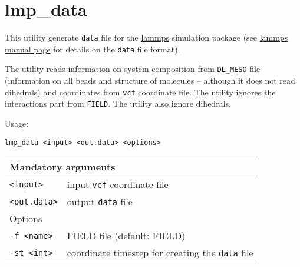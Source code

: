 \section{lmp\_data} \label{sec:lmp_data}

This utility generate \texttt{data} file for the
\href{https://lammps.sandia.gov/}{lammps} simulation package (see
\href{https://lammps.sandia.gov/doc/read_data.html}{lammps manual page} for
details on the \texttt{data} file format).

The utility reads information on system composition from \texttt{DL\_MESO}
file (information on all beads and structure of molecules -- although it
does not read dihedrals) and coordinates from \texttt{vcf} coordinate file.
The utility ignores the interactions part from \texttt{FIELD}. The utility
also ignore dihedrals.

Usage:

\vspace{1em}
\noindent
\texttt{lmp\_data <input> <out.data> <options>}

\noindent
\begin{longtable}{p{}p{}}
  \toprule
  \multicolumn{2}{l}{Mandatory arguments} \\
  \midrule
  \texttt{<input>} & input \texttt{vcf} coordinate file \\
  \texttt{<out.data>} & output \texttt{data} file \\
  \toprule
  \multicolumn{2}{l}{Options} \\
  \midrule
  \texttt{-f <name>} & FIELD file (default: FIELD)\\
  \texttt{-st <int>} & coordinate timestep for creating the \texttt{data}
  file \\
  \bottomrule
\end{longtable}
